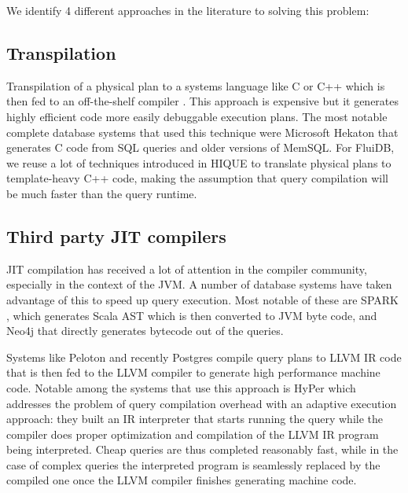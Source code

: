 We identify 4 different approaches in the literature to solving this
problem:

\subsection{Transpilation}
\label{sec:transpilation}

Transpilation of a physical plan to a systems language like C or C++
which is then fed to an off-the-shelf compiler
\cite{krikellasGeneratingCodeHolistic2010}. This approach is expensive
but it generates highly efficient code more easily debuggable
execution plans. The most notable complete database systems that used
this technique were Microsoft Hekaton that generates C code from SQL queries and
older versions of MemSQL. For FluiDB, we reuse a lot of techniques
introduced in HIQUE \cite{krikellasGeneratingCodeHolistic2010} to
translate physical plans to template-heavy C++ code, making the
assumption that query compilation will be much faster than the query
runtime.

\subsection{Third party JIT compilers}

JIT compilation has received a lot of attention in the compiler
community, especially in the context of the JVM. A number of database
systems have taken advantage of this to speed up query execution. Most
notable of these are SPARK \cite{armbrustSparkSQLRelational2015}, which
generates Scala AST which is then converted to JVM byte code, and
Neo4j that directly generates bytecode out of the queries.

Systems like Peloton \cite{menonRelaxedOperatorFusion2017} and recently
Postgres \cite{sharyginQueryCompilationPostgreSQL2017} compile query
plans to LLVM IR code that is then fed to the LLVM compiler to
generate high performance machine code. Notable among the systems that
use this approach is HyPer \cite{neumannEvolutionCompilingQueryEngine}
which addresses the problem of query compilation overhead with an
adaptive execution approach: they built an IR interpreter that starts
running the query while the compiler does proper optimization and compilation of the
LLVM IR program being interpreted. Cheap queries are thus completed
reasonably fast, while in the case of complex queries the interpreted
program is seamlessly replaced by the compiled one once the LLVM
compiler finishes generating machine code.

